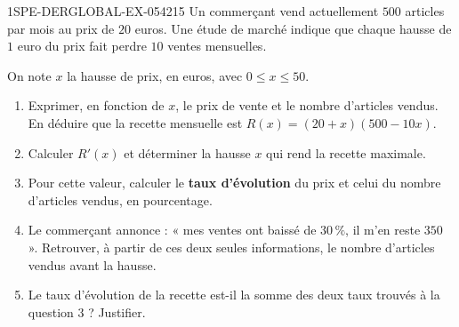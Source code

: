 \begin{exercice}{1SPE-DERGLOBAL-EX-054}{2}{15}
Un commerçant vend actuellement $500$ articles par mois au prix de $20$ euros.
Une étude de marché indique que chaque hausse de $1$ euro du prix fait perdre
$10$ ventes mensuelles.

On note $x$ la hausse de prix, en euros, avec $0 \leqslant x \leqslant 50$.
\begin{enumerate}
\item Exprimer, en fonction de $x$, le prix de vente et le nombre d'articles
  vendus. En déduire que la recette mensuelle est
  $R(x) = (20+x)(500-10x)$.
\item Calculer $R'(x)$ et déterminer la hausse $x$ qui rend la recette maximale.
\item Pour cette valeur, calculer le \textbf{taux d'évolution} du prix et celui
  du nombre d'articles vendus, en pourcentage.
\item Le commerçant annonce : « mes ventes ont baissé de $30\,\%$, il m'en
  reste $350$ ». Retrouver, à partir de ces deux seules informations, le
  nombre d'articles vendus avant la hausse.
\item Le taux d'évolution de la recette est-il la somme des deux taux trouvés
  à la question 3 ? Justifier.
\end{enumerate}
\end{exercice}
